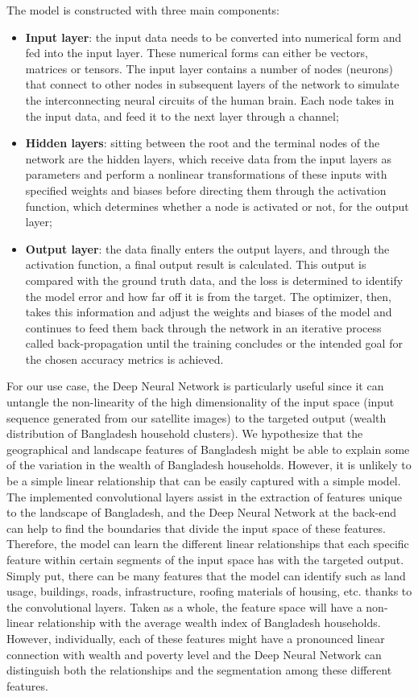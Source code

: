 \documentclass[solid,math,chem,code,plot,gloss]{bmc}
\begin{document}
The model is constructed with three main components: 
\begin{itemize}
    \item \textbf{Input layer}: the input data needs to be converted into numerical form and fed into the input layer. These numerical forms can either be vectors, matrices or tensors. The input layer contains a number of nodes (neurons) that connect to other nodes in subsequent layers of the network to simulate the interconnecting neural circuits of the human brain. Each node takes in the input data, and feed it to the next layer through a channel; 
    \item \textbf{Hidden layers}: sitting between the root and the terminal nodes of the network are the hidden layers, which receive data from the input layers as parameters and perform a nonlinear transformations of these inputs with specified weights and biases before directing them through the activation function, which determines whether a node is activated or not, for the output layer;
    \item \textbf{Output layer}: the data finally enters the output layers, and through the activation function, a final output result is calculated. This output is compared with the ground truth data, and the loss is determined to identify the model error and how far off it is from the target. The optimizer, then, takes this information and adjust the weights and biases of the model and continues to feed them back through the network in an iterative process called back-propagation until the training concludes or the intended goal for the chosen accuracy metrics is achieved.
\end{itemize}

For our use case, the Deep Neural Network is particularly useful since it can untangle the non-linearity of the high dimensionality of the input space (input sequence generated from our satellite images) to the targeted output (wealth distribution of Bangladesh household clusters). We hypothesize that the geographical and landscape features of Bangladesh might be able to explain some of the variation in the wealth of Bangladesh households. However, it is unlikely to be a simple linear relationship that can be easily captured with a simple model. The implemented convolutional layers assist in the extraction of features unique to the landscape of Bangladesh, and the Deep Neural Network at the back-end can help to find the boundaries that divide the input space of these features. Therefore, the model can learn the different linear relationships that each specific feature within certain segments of the input space has with the targeted output. Simply put, there can be many features that the model can identify such as land usage, buildings, roads, infrastructure, roofing materials of housing, etc. thanks to the convolutional layers. Taken as a whole, the feature space will have a non-linear relationship with the average wealth index of Bangladesh households. However, individually, each of these features might have a pronounced linear connection with wealth and poverty level and the Deep Neural Network can distinguish both the relationships and the segmentation among these different features. 
\end{document}
